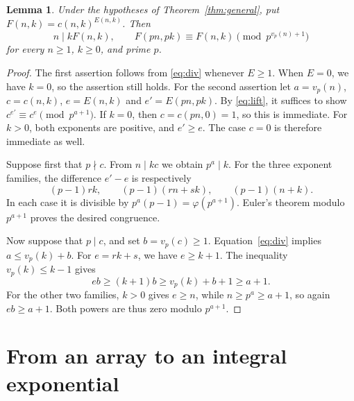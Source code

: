 \documentclass[11pt]{article}
\newtheorem{lemma}[theorem]{Lemma}
\begin{document}
\begin{lemma}\label{lem:powered}
Under the hypotheses of Theorem~\ref{thm:general}, put
\(F(n,k)=c(n,k)^{E(n,k)}\). Then
\begin{equation}\label{eq:array}
 n\mid kF(n,k),\qquad
 F(pn,pk)\equiv F(n,k)\pmod {p^{v_p(n)+1}}
\end{equation}
for every \(n\ge1\), \(k\ge0\), and prime \(p\).
\end{lemma}
\begin{proof}
The first assertion follows from \eqref{eq:div} whenever \(E\ge1\).
When \(E=0\), we have \(k=0\), so the assertion still holds.
For the second assertion let \(a=v_p(n)\), \(c=c(n,k)\),
\(e=E(n,k)\) and \(e'=E(pn,pk)\).
By \eqref{eq:lift}, it suffices to show
\(c^{e'}\equiv c^e\pmod {p^{a+1}}\).
If \(k=0\), then \(c=c(pn,0)=1\), so this is immediate.
For \(k>0\), both exponents are positive, and \(e'\ge e\).
The case \(c=0\) is therefore immediate as well.

Suppose first that \(p\nmid c\). From \(n\mid kc\) we obtain
\(p^a\mid k\). For the three exponent families, the difference \(e'-e\) is respectively
\[
 (p-1)rk,\qquad (p-1)(rn+sk),\qquad (p-1)(n+k).
\]
In each case it is divisible by \(p^a(p-1)=\varphi(p^{a+1})\).
Euler's theorem modulo \(p^{a+1}\) proves the desired congruence.

Now suppose that \(p\mid c\), and set \(b=v_p(c)\ge1\).
Equation~\eqref{eq:div} implies \(a\le v_p(k)+b\).
For \(e=rk+s\), we have $e\ge k+1$. The inequality \(v_p(k)\le k-1\) gives
\[
 eb\ge(k+1)b\ge v_p(k)+b+1\ge a+1.
\]
For the other two families, \(k>0\) gives \(e\ge n\), while
\(n\ge p^a\ge a+1\), so again \(eb\ge a+1\).
Both powers are thus zero modulo \(p^{a+1}\).
\end{proof}

\section{From an array to an integral exponential}
\end{document}
